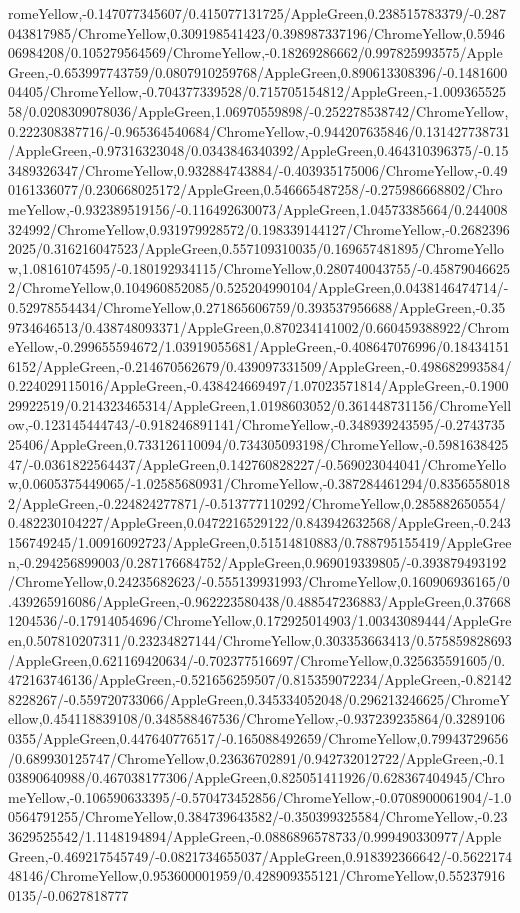 {\begin{tikzternal}
romeYellow,-0.147077345607/0.415077131725/AppleGreen,0.238515783379/-0.287043817985/ChromeYellow,0.309198541423/0.398987337196/ChromeYellow,0.594606984208/0.105279564569/ChromeYellow,-0.18269286662/0.997825993575/AppleGreen,-0.653997743759/0.0807910259768/AppleGreen,0.890613308396/-0.148160004405/ChromeYellow,-0.704377339528/0.715705154812/AppleGreen,-1.00936552558/0.0208309078036/AppleGreen,1.06970559898/-0.252278538742/ChromeYellow,0.222308387716/-0.965364540684/ChromeYellow,-0.944207635846/0.131427738731/AppleGreen,-0.97316323048/0.0343846340392/AppleGreen,0.464310396375/-0.153489326347/ChromeYellow,0.932884743884/-0.403935175006/ChromeYellow,-0.490161336077/0.230668025172/AppleGreen,0.546665487258/-0.275986668802/ChromeYellow,-0.932389519156/-0.116492630073/AppleGreen,1.04573385664/0.244008324992/ChromeYellow,0.931979928572/0.198339144127/ChromeYellow,-0.26823962025/0.316216047523/AppleGreen,0.557109310035/0.169657481895/ChromeYellow,1.08161074595/-0.180192934115/ChromeYellow,0.280740043755/-0.458790466252/ChromeYellow,0.104960852085/0.525204990104/AppleGreen,0.0438146474714/-0.52978554434/ChromeYellow,0.271865606759/0.393537956688/AppleGreen,-0.359734646513/0.438748093371/AppleGreen,0.870234141002/0.660459388922/ChromeYellow,-0.299655594672/1.03919055681/AppleGreen,-0.408647076996/0.184341516152/AppleGreen,-0.214670562679/0.439097331509/AppleGreen,-0.498682993584/0.224029115016/AppleGreen,-0.438424669497/1.07023571814/AppleGreen,-0.190029922519/0.214323465314/AppleGreen,1.0198603052/0.361448731156/ChromeYellow,-0.123145444743/-0.918246891141/ChromeYellow,-0.348939243595/-0.274373525406/AppleGreen,0.733126110094/0.734305093198/ChromeYellow,-0.598163842547/-0.0361822564437/AppleGreen,0.142760828227/-0.569023044041/ChromeYellow,0.0605375449065/-1.02585680931/ChromeYellow,-0.387284461294/0.83565580182/AppleGreen,-0.224824277871/-0.513777110292/ChromeYellow,0.285882650554/0.482230104227/AppleGreen,0.0472216529122/0.843942632568/AppleGreen,-0.243156749245/1.00916092723/AppleGreen,0.51514810883/0.788795155419/AppleGreen,-0.294256899003/0.287176684752/AppleGreen,0.969019339805/-0.393879493192/ChromeYellow,0.24235682623/-0.555139931993/ChromeYellow,0.160906936165/0.439265916086/AppleGreen,-0.962223580438/0.488547236883/AppleGreen,0.376681204536/-0.17914054696/ChromeYellow,0.172925014903/1.00343089444/AppleGreen,0.507810207311/0.23234827144/ChromeYellow,0.303353663413/0.575859828693/AppleGreen,0.621169420634/-0.702377516697/ChromeYellow,0.325635591605/0.472163746136/AppleGreen,-0.521656259507/0.815359072234/AppleGreen,-0.821428228267/-0.559720733066/AppleGreen,0.345334052048/0.296213246625/ChromeYellow,0.454118839108/0.348588467536/ChromeYellow,-0.937239235864/0.32891060355/AppleGreen,0.447640776517/-0.165088492659/ChromeYellow,0.79943729656/0.689930125747/ChromeYellow,0.23636702891/0.942732012722/AppleGreen,-0.103890640988/0.467038177306/AppleGreen,0.825051411926/0.628367404945/ChromeYellow,-0.106590633395/-0.570473452856/ChromeYellow,-0.0708900061904/-1.00564791255/ChromeYellow,0.384739643582/-0.350399325584/ChromeYellow,-0.233629525542/1.1148194894/AppleGreen,-0.0886896578733/0.999490330977/AppleGreen,-0.469217545749/-0.0821734655037/AppleGreen,0.918392366642/-0.562217448146/ChromeYellow,0.953600001959/0.428909355121/ChromeYellow,0.552379160135/-0.0627818777
\end{tikzternal}}
